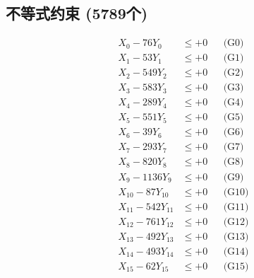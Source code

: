 \documentclass[a4paper,10pt]{article}
\begin{document}
\subsection{不等式约束 (5789个)}

\allowdisplaybreaks
{\small
\begin{align}
\allowbreak
\allowbreak
\allowbreak
\allowbreak
\allowbreak
\allowbreak
\allowbreak
\allowbreak
\allowbreak
\allowbreak
\allowbreak
\allowbreak
\allowbreak
\allowbreak
\allowbreak
\allowbreak
\allowbreak
\allowbreak
\allowbreak
\allowbreak
\allowbreak
\allowbreak
\allowbreak
\allowbreak
\allowbreak
\allowbreak
\allowbreak
\allowbreak
\allowbreak
\allowbreak
\allowbreak
\allowbreak
\allowbreak
\allowbreak
\allowbreak
\allowbreak
\allowbreak
\allowbreak
\allowbreak
\allowbreak
\allowbreak
\allowbreak
\allowbreak
\allowbreak
\allowbreak
\allowbreak
\allowbreak
\allowbreak
\allowbreak
\allowbreak
\allowbreak
\allowbreak
\allowbreak
\allowbreak
\allowbreak
\allowbreak
\allowbreak
\allowbreak
\allowbreak
\allowbreak
\allowbreak
\allowbreak
\allowbreak
\allowbreak
\allowbreak
\allowbreak
\allowbreak
\allowbreak
\allowbreak
\allowbreak
\allowbreak
\allowbreak
\allowbreak
\allowbreak
\allowbreak
\allowbreak
\allowbreak
\allowbreak
X_{0} - 76Y_{0} &\leq +0 && \text{(G0)} \\
\allowbreak
X_{1} - 53Y_{1} &\leq +0 && \text{(G1)} \\
X_{2} - 549Y_{2} &\leq +0 && \text{(G2)} \\
X_{3} - 583Y_{3} &\leq +0 && \text{(G3)} \\
X_{4} - 289Y_{4} &\leq +0 && \text{(G4)} \\
X_{5} - 551Y_{5} &\leq +0 && \text{(G5)} \\
X_{6} - 39Y_{6} &\leq +0 && \text{(G6)} \\
X_{7} - 293Y_{7} &\leq +0 && \text{(G7)} \\
X_{8} - 820Y_{8} &\leq +0 && \text{(G8)} \\
X_{9} - 1136Y_{9} &\leq +0 && \text{(G9)} \\
X_{10} - 87Y_{10} &\leq +0 && \text{(G10)} \\
\allowbreak
X_{11} - 542Y_{11} &\leq +0 && \text{(G11)} \\
X_{12} - 761Y_{12} &\leq +0 && \text{(G12)} \\
X_{13} - 492Y_{13} &\leq +0 && \text{(G13)} \\
X_{14} - 493Y_{14} &\leq +0 && \text{(G14)} \\
X_{15} - 62Y_{15} &\leq +0 && \text{(G15)} \\

\end{align}}
\end{document}
